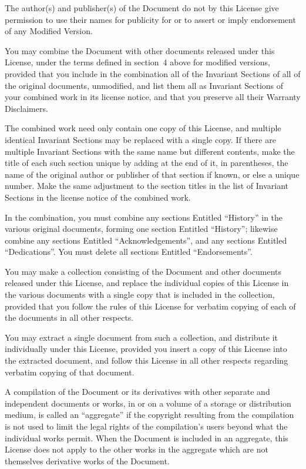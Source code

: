 \documentclass{article}
\begin{document}
The author(s) and publisher(s) of the Document do not by this License
give permission to use their names for publicity for or to assert or
imply endorsement of any Modified Version.



You may combine the Document with other documents released under this
License, under the terms defined in section~4 above for modified
versions, provided that you include in the combination all of the
Invariant Sections of all of the original documents, unmodified, and
list them all as Invariant Sections of your combined work in its
license notice, and that you preserve all their Warranty Disclaimers.

The combined work need only contain one copy of this License, and
multiple identical Invariant Sections may be replaced with a single
copy.  If there are multiple Invariant Sections with the same name but
different contents, make the title of each such section unique by
adding at the end of it, in parentheses, the name of the original
author or publisher of that section if known, or else a unique number.
Make the same adjustment to the section titles in the list of
Invariant Sections in the license notice of the combined work.

In the combination, you must combine any sections Entitled ``History''
in the various original documents, forming one section Entitled
``History''; likewise combine any sections Entitled ``Acknowledgements'',
and any sections Entitled ``Dedications''.  You must delete all sections
Entitled ``Endorsements''.



You may make a collection consisting of the Document and other documents
released under this License, and replace the individual copies of this
License in the various documents with a single copy that is included in
the collection, provided that you follow the rules of this License for
verbatim copying of each of the documents in all other respects.

You may extract a single document from such a collection, and distribute
it individually under this License, provided you insert a copy of this
License into the extracted document, and follow this License in all
other respects regarding verbatim copying of that document.



A compilation of the Document or its derivatives with other separate
and independent documents or works, in or on a volume of a storage or
distribution medium, is called an ``aggregate'' if the copyright
resulting from the compilation is not used to limit the legal rights
of the compilation's users beyond what the individual works permit.
When the Document is included in an aggregate, this License does not
apply to the other works in the aggregate which are not themselves
derivative works of the Document.
\end{document}
